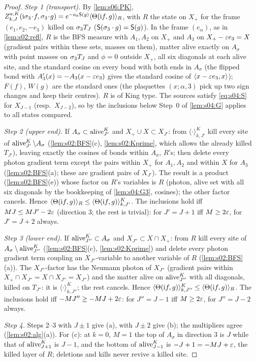 \begin{proof}
\emph{Step 1 (transport).} By \cref{lem:s06:PK}, $Z^{a,K}_{k,J}(\mathrm i\sigma_3\!\cdot\!f,\sigma_3\!\cdot\!g)=e^{-a_k\mathsf S(g)}\langle \Theta(\mathrm if,g)\rangle_R$, with $R$ the state on $X_+$ for the frame $(e_1,e_2,-e_3)$ killed on $\sigma_3T_J$ ($\mathsf S(\sigma_3\cdot g)=\mathsf S(g)$). In the frame $(e_\alpha)$, as in \cref{lem:s02:refl}, $R$ is the BFS measure with $A_1,A_2$ on $X_+$ and $A_3$ on $X_+-\varepsilon e_3=X$ (gradient pairs within these sets, masses on them), matter alive exactly on $A_\sigma$ with point masses on $\sigma_3T_J$ and $\phi=0$ outside $X_+$, all six diagonals at each alive site, and the standard cosine on every bond with both ends in $A_\sigma$ (the flipped bond with $A'_3(x)=-A_3(x-\varepsilon e_3)$ gives the standard cosine of $\langle x-\varepsilon e_3,x\rangle$); $F(f)$, $W(g)$ are the standard ones (the plaquettes $(x;\alpha,3)$ pick up two sign changes and keep their centres). $R$ is of King type. The sources satisfy \eqref{eq:s04:S} for $X_{J-1}$ (resp.\ $X_{J-2}$), so by the inclusions below Step~0 of \cref{lem:s04:G} applies to all states compared.

\emph{Step 2 (upper end).} If $A_\sigma\subset\operatorname{alive}^K_{J'}$ and $X_+\cup X\subset X_{J'}$: from $\langle\cdot\rangle^K_{k,J'}$ kill every site of $\operatorname{alive}^K_{J'}\setminus A_\sigma$ (\cref{lem:s02:BFS}(c), \cref{lem:s02:Kprime}, which allows the already killed $T_{J'}$), leaving exactly the cosines of bonds within $A_\sigma$, \ie $R$'s; then delete every photon gradient term except the pairs within $X_+$ for $A_1,A_2$ and within $X$ for $A_3$ (\cref{lem:s02:BFS}(a); these are gradient pairs of $X_{J'}$). The result is a product (\cref{lem:s02:BFS}(e)) whose factor on $R$'s variables is $R$ (photon, alive set with all six diagonals by the bookkeeping of \cref{lem:s04:G3}, cosines); the other factor cancels. Hence $\langle \Theta(\mathrm if,g)\rangle_R\le\langle\Theta(\mathrm if,g)\rangle^K_{k,J'}$. The inclusions hold iff $MJ\le MJ'-2\varepsilon$ (direction $3$; the rest is trivial): for $J'=J+1$ iff $M\ge2\varepsilon$, for $J'=J+2$ always.

\emph{Step 3 (lower end).} If $\operatorname{alive}^K_{J''}\subset A_\sigma$ and $X_{J''}\subset X\cap X_+$: from $R$ kill every site of $A_\sigma\setminus\operatorname{alive}^K_{J''}$ (\cref{lem:s02:BFS}(c), \cref{lem:s02:Kprime}) and delete every photon gradient term coupling an $X_{J''}$-variable to another variable of $R$ (\cref{lem:s02:BFS}(a)). The $X_{J''}$-factor has the Neumann photon of $X_{J''}$ (gradient pairs within $X_+\cap X_{J''}=X\cap X_{J''}=X_{J''}$) and the matter alive on $\operatorname{alive}^K_{J''}$ with all diagonals, killed on $T_{J''}$: it is $\langle\cdot\rangle^K_{k,J''}$; the rest cancels. Hence $\langle\Theta(\mathrm if,g)\rangle^K_{k,J''}\le\langle \Theta(\mathrm if,g)\rangle_R$. The inclusions hold iff $-MJ''\ge-MJ+2\varepsilon$: for $J''=J-1$ iff $M\ge2\varepsilon$, for $J''=J-2$ always.

\emph{Step 4.} Steps 2--3 with $J\pm1$ give (a), with $J\pm2$ give (b); the multipliers agree (\cref{lem:s02:alg}(a)). For (c): at $k=0$, $M=1$ the top of $A_\sigma$ in direction $3$ is $J$ while that of $\operatorname{alive}^K_{J+1}$ is $J-1$, and the bottom of $\operatorname{alive}^K_{J-1}$ is $-J+1=-MJ+\varepsilon$, the killed layer of $R$; deletions and kills never revive a killed site.
\end{proof}

